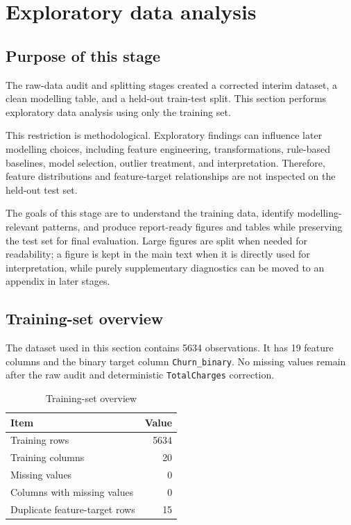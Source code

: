 \section{Exploratory data analysis}

\subsection{Purpose of this stage}

The raw-data audit and splitting stages created a corrected interim dataset, a clean modelling table, and a held-out train-test split. This section performs exploratory data analysis using only the training set.

This restriction is methodological. Exploratory findings can influence later modelling choices, including feature engineering, transformations, rule-based baselines, model selection, outlier treatment, and interpretation. Therefore, feature distributions and feature-target relationships are not inspected on the held-out test set.

The goals of this stage are to understand the training data, identify modelling-relevant patterns, and produce report-ready figures and tables while preserving the test set for final evaluation. Large figures are split when needed for readability; a figure is kept in the main text when it is directly used for interpretation, while purely supplementary diagnostics can be moved to an appendix in later stages.

\subsection{Training-set overview}

The dataset used in this section contains 5634 observations. It has 19 feature columns and the binary target column \texttt{Churn\_binary}. No missing values remain after the raw audit and deterministic \texttt{TotalCharges} correction.

\begin{table}[H]
\centering
\caption{Training-set overview}
\begin{tabular}{lr}
\toprule
Item & Value \\
\midrule
Training rows & 5634 \\
Training columns & 20 \\
Missing values & 0 \\
Columns with missing values & 0 \\
Duplicate feature-target rows & 15 \\
\bottomrule
\end{tabular}
\end{table}

